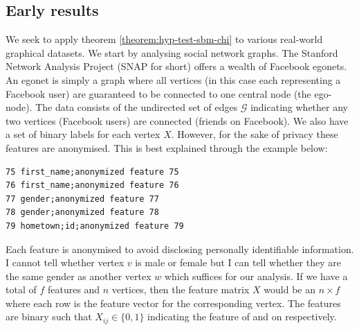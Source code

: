 \documentclass[]{article}
\newcommand{\Gcal}{\mathcal{G}}
\begin{document}
\subsection{Early results}

We seek to apply theorem \ref{theorem:hyp-test-sbm-chi} to various real-world graphical datasets. We start by analysing social network graphs. The Stanford Network Analysis Project (SNAP for short) \cite{snapnets} offers a wealth of Facebook egonets. An egonet is simply a graph where all vertices (in this case each representing a Facebook user) are guaranteed to be connected to one central node (the ego-node). The data consists of the undirected set of edges $\Gcal$ indicating whether any two vertices (Facebook users) are connected (friends on Facebook). We also have a set of binary labels for each vertex $X$. However, for the sake of privacy these features are anonymised. This is best explained through the example below: \\

\begin{center}
\begin{minipage}{8cm}
\begin{Verbatim}[fontsize=\small, frame=single, label={\fbox{Example anonymised feature flags}}]
75 first_name;anonymized feature 75
76 first_name;anonymized feature 76
77 gender;anonymized feature 77
78 gender;anonymized feature 78
79 hometown;id;anonymized feature 79
\end{Verbatim}
\end{minipage}
\end{center}


Each feature is anonymised to avoid disclosing personally identifiable information. I cannot tell whether vertex $v$ is male or female but I can tell whether they are the same gender as another vertex $w$ which suffices for our analysis. If we have a total of $f$ features and $n$ vertices, then the feature matrix $X$ would be an $n \times f$ where each row is the feature vector for the corresponding vertex. The features are binary such that $X_{ij} \in \{0, 1\}$ indicating the feature of and on respectively.
\end{document}
